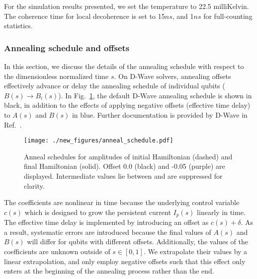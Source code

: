 \documentclass[prd,twocolumn,tightenlines,preprintnumbers,showpacs,superscriptaddress,notitlepage,nofootinbib,eqsecnum,floatfix,longbibliography,aps,10pt]{revtex4-2}
\begin{document}
For the simulation results presented, we set the temperature to 22.5 milliKelvin.
The coherence time for local decoherence is set to 15$ns$, and 1$ns$ for full-counting statistics.

\subsubsection{Annealing schedule and offsets}
\label{sec:methods:annealing-schedule}
In this section, we discuss the details of the annealing schedule with respect to the dimensionless normalized time $s$.
On D-Wave solvers, annealing offsets effectively advance or delay the annealing schedule of individual qubits ($B(s) \to B_i(s)$).
In Fig.~\ref{fig:anneal_schedule}, the default D-Wave annealing schedule is shown in black, in addition to the effects of applying negative offsets (effective time delay) to $A(s)$ and $B(s)$ in blue.
Further documentation is provided by D-Wave in Ref.~\cite{dwave_as, dwave_as_docu}.

\begin{figure}[htb]
 \centering
  \texttt{[image: ./new\_figures/anneal\_schedule.pdf]}
  \caption{
  Anneal schedules for amplitudes of initial Hamiltonian (dashed) and final Hamiltonian (solid).
  Offset 0.0 (black) and -0.05 (purple) are displayed.
  Intermediate values lie between and are suppressed for clarity.
 }
 \label{fig:anneal_schedule}
\end{figure}

The coefficients are nonlinear in time because the underlying control variable $c(s)$ which is designed to grow the persistent current $I_p(s)$ linearly in time.
The effective time delay is implemented by introducing an offset as $c(s) + \delta$.
As a result, systematic errors are introduced because the final values of $A(s)$ and $B(s)$ will differ for qubits with different offsets.
Additionally, the values of the coefficients are unknown outside of $s\in [0, 1]$.
We extrapolate their values by a linear extrapolation, and only employ negative offsets such that this effect only enters at the beginning of the annealing process rather than the end.
\end{document}
